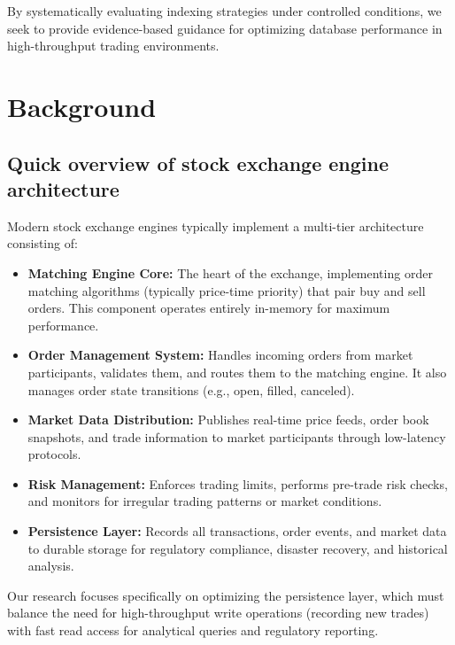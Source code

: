 \documentclass[11pt,a4paper]{article}
\begin{document}
By systematically evaluating indexing strategies under controlled conditions, we seek to provide evidence-based guidance for optimizing database performance in high-throughput trading environments.

\section{Background}

\subsection{Quick overview of stock exchange engine architecture}

Modern stock exchange engines typically implement a multi-tier architecture consisting of:

\begin{itemize}
    \item \textbf{Matching Engine Core:} The heart of the exchange, implementing order matching algorithms (typically price-time priority) that pair buy and sell orders. This component operates entirely in-memory for maximum performance.
    
    \item \textbf{Order Management System:} Handles incoming orders from market participants, validates them, and routes them to the matching engine. It also manages order state transitions (e.g., open, filled, canceled).
    
    \item \textbf{Market Data Distribution:} Publishes real-time price feeds, order book snapshots, and trade information to market participants through low-latency protocols.
    
    \item \textbf{Risk Management:} Enforces trading limits, performs pre-trade risk checks, and monitors for irregular trading patterns or market conditions.
    
    \item \textbf{Persistence Layer:} Records all transactions, order events, and market data to durable storage for regulatory compliance, disaster recovery, and historical analysis.
\end{itemize}

Our research focuses specifically on optimizing the persistence layer, which must balance the need for high-throughput write operations (recording new trades) with fast read access for analytical queries and regulatory reporting.
\end{document}
